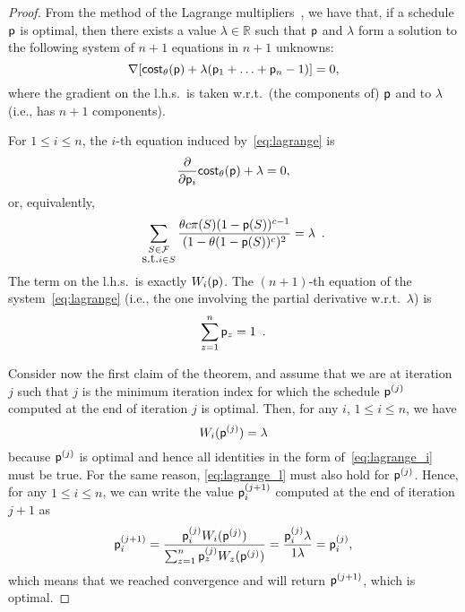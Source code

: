 \begin{proof}
	From the method of the Lagrange multipliers~\citep[Sect.~5.1]{BoydV04}, we
	have that, if a schedule $\mathsf{p}$ is optimal, then there exists a value
	$\lambda\in\mathbb{R}$ such that $\mathsf{p}$ and $\lambda$ form a solution to
	the following system of $n+1$ equations in $n+1$ unknowns:
	\begin{equation}\label{eq:lagrange}
		\nabla [\mathsf{cost}_\theta(\mathsf{p}) + \lambda (\mathsf{p}_1+\ldots+\mathsf{p}_n-1)] = 0,
	\end{equation}
	where the gradient on the l.h.s.~is taken w.r.t.~(the components of)
	$\mathsf{p}$ and to $\lambda$ (i.e., has $n+1$ components).

	For $1\le i\le n$, the $i$-th equation induced by~\eqref{eq:lagrange} is
	\[
		\frac{\partial}{\partial \mathsf{p}_i} \mathsf{cost}_\theta(\mathsf{p}) + \lambda = 0,
	\]
	or, equivalently,
	\begin{equation}\label{eq:lagrange_i}
		\sum_{\substack{S\in\mathcal{F}\\\mbox{s.t.} i\in S}} \frac{\theta c
			\pi(S) (1-\mathsf{p}(S))^{c-1}}{(1-\theta(1-\mathsf{p}(S))^c)^2} =
			\lambda\enspace.
	\end{equation}
	The term on the l.h.s.~is exactly $W_i(\mathsf{p})$.
	The $(n+1)$-th equation of the system~\eqref{eq:lagrange} (i.e., the one
	involving the partial derivative w.r.t.~$\lambda$) is
	\begin{equation}\label{eq:lagrange_l}
		\sum_{z=1}^n \mathsf{p}_z = 1\enspace.
	\end{equation}

	Consider now the first claim of the theorem, and assume that we
	are at iteration $j$ such that $j$ is the minimum iteration index for which
	the schedule $\mathsf{p}^{(j)}$ computed at the end of iteration $j$ is optimal.
	Then, for any $i$, $1\le i\le n$, we have
	\[
		W_i(\mathsf{p}^{(j)})=\lambda
	\]
	because $\mathsf{p}^{(j)}$ is optimal and hence all identities in the form
	of~\eqref{eq:lagrange_i} must be true. For the same reason,
	\eqref{eq:lagrange_l} must also hold for $\mathsf{p}^{(j)}$.
	Hence, for any $1\le i\le n$, we can write the value $\mathsf{p}^{(j+1)}_i$
	computed at the end of iteration $j+1$ as
	\[
		\mathsf{p}^{(j+1)}_i = \frac{\mathsf{p}^{(j)}_i W_i(\mathsf{p}^{(j)})}{\sum_{z=1}^n
		\mathsf{p}^{(j)}_z W_z(\mathsf{p}^{(j)})}=
		\frac{\mathsf{p}^{(j)}_i\lambda}{1\lambda}=\mathsf{p}^{(j)}_i,
	\]
	which means that we reached convergence and \algoname will return
	$\mathsf{p}^{(j+1)}$, which is optimal. %


\end{proof}
